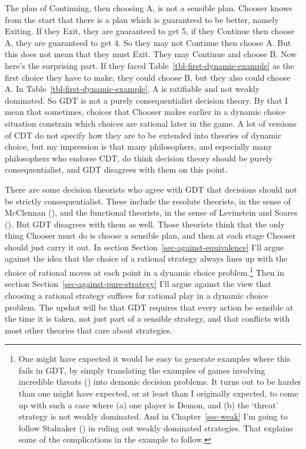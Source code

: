 \documentclass[
  12pt,
  letterpaper,
  DIV=11,
  numbers=noendperiod]{scrreprt}
\begin{document}
The plan of Continuing, then choosing A, is not a sensible plan. Chooser
knows from the start that there is a plan which is guaranteed to be
better, namely Exiting. If they Exit, they are guaranteed to get 5, if
they Continue then choose A, they are guaranteed to get 4. So they may
not Continue then choose A. But this does not mean that they must Exit.
They may Continue and choose B. Now here's the surprising part. If they
faced Table~\ref{tbl-first-dynamic-example} as the first choice they
have to make, they could choose B, but they also could choose A. In
Table~\ref{tbl-first-dynamic-example}, A is ratifiable and not weakly
dominated. So GDT is not a purely consequentialist decision theory. By
that I mean that sometimes, choices that Chooser makes earlier in a
dynamic choice situation constrain which choices are rational later in
the game. A lot of versions of CDT do not specify how they are to be
extended into theories of dynamic choice, but my impression is that many
philosophers, and especially many philosophers who endorse CDT, do think
decision theory should be purely consequentialist, and GDT disagrees
with them on this point.

There are some decision theorists who agree with GDT that decisions
should not be strictly consequentialist. These include the resolute
theorists, in the sense of McClennan
(), and the functional theorists, in
the sense of Levinstein and Soares
(). But GDT disagrees with them
as well. Those theorists think that the only thing Chooser must do is
choose a sensible plan, and then at each stage Chooser should just carry
it out. In section Section~\ref{sec-against-equivalence} I'll argue
against the idea that the choice of a rational strategy always lines up
with the choice of rational moves at each point in a dynamic choice
problem.\footnote{One might have expected it would be easy to generate
  examples where this fails in GDT, by simply translating the examples
  of games involving incredible threats
  () into demonic decision
  problems. It turns out to be harder than one might have expected, or
  at least than I originally expected, to come up with such a case where
  (a) one player is Demon, and (b) the `threat' strategy is not weakly
  dominated. And in Chapter~\ref{sec-weak} I'm going to follow Stalnaker
  () in ruling out weakly dominated
  strategies. That explains some of the complications in the example to
  follow.} Then in section Section~\ref{sec-against-pure-strategy} I'll
argue against the view that choosing a rational strategy suffices for
rational play in a dynamic choice problem. The upshot will be that GDT
requires that every action be sensible at the time it is taken, not just
part of a sensible strategy, and that conflicts with most other theories
that care about strategies.
\end{document}
